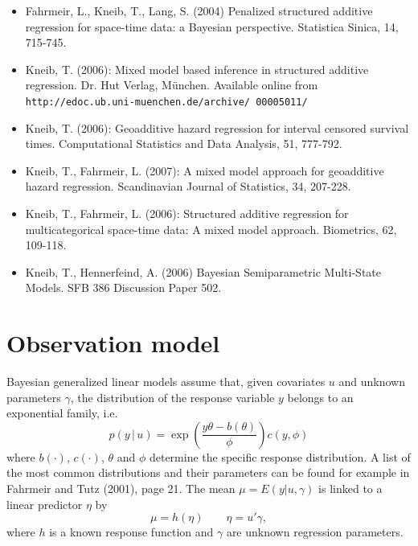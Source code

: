 \documentclass[11pt,a4paper,twoside]{bayesxarticle}
\begin{document}
\begin{itemize}
\item Fahrmeir, L., Kneib, T., Lang, S. (2004)
      Penalized structured additive regression for space-time data: a Bayesian perspective.
      Statistica Sinica, 14, 715-745.\vspace{-0.25cm}
\item Kneib, T. (2006):
      Mixed model based inference in structured additive regression.
      Dr. Hut Verlag, M\"{u}nchen.
      Available online from {\tt http://edoc.ub.uni-muenchen.de/archive/ 00005011/}\vspace{-0.25cm}
\item Kneib, T. (2006):
      Geoadditive hazard regression for interval censored survival times.
      Computational Statistics and Data Analysis, 51, 777-792.\vspace{-0.25cm}
\item Kneib, T., Fahrmeir, L. (2007):
      A mixed model approach for geoadditive hazard regression.
      Scandinavian Journal of Statistics, 34, 207-228.\vspace{-0.25cm}
\item Kneib, T., Fahrmeir, L. (2006):
      Structured additive regression for multicategorical space-time data: A mixed model approach.
      Biometrics, 62, 109-118.\vspace{-0.25cm}
\item Kneib, T., Hennerfeind, A. (2006)
      Bayesian Semiparametric Multi-State Models.
      SFB 386 Discussion Paper 502.
\end{itemize}



\section{Observation model}\label{obsmodel}

 Bayesian
generalized linear models assume that, given covariates $u$ and
unknown parameters $\gamma$, the distribution of the response
variable $y$ belongs to an exponential family, i.e.
\begin{equation}
\label{likel} p(y \, | \, u) = \exp \left( \frac{y \theta -
b(\theta)}{\phi} \right) c(y,\phi)
\end{equation}
where $b(\cdot)$, $c(\cdot)$, $\theta$ and $\phi$ determine the
specific response distribution. A list of the most common
distributions and their parameters can be found for example in
Fahrmeir and Tutz (2001), page 21. The mean $\mu=E(y|u,\gamma)$ is
linked to a linear predictor $\eta$ by
\begin{equation}
\label{glm} \mu=h(\eta) \qquad \eta= u'\gamma,
\end{equation}
where $h$ is a known response function and $\gamma$ are unknown
regression parameters.
\end{document}
